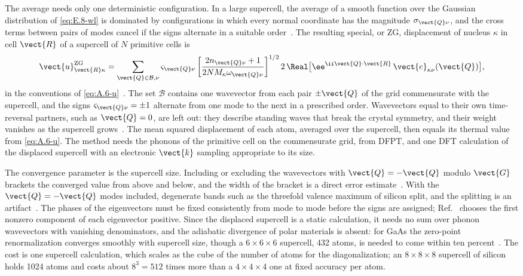 The average needs only one deterministic configuration. In a large supercell, the average of a smooth function over the Gaussian distribution of \cref{eq:E.8-wl} is dominated by configurations in which every normal coordinate has the magnitude $\sigma_{\vect{Q}\nu}$, and the cross terms between pairs of modes cancel if the signs alternate in a suitable order~\cite[Sect.~III]{zacharias2016one}. The resulting special, or ZG, displacement of nucleus $\kappa$ in cell $\vect{R}$ of a supercell of $N$ primitive cells is
\begin{equation}
  \vect{u}^{\mathrm{ZG}}_{\vect{R}\kappa} = \sum_{\vect{Q}\in\mathcal{B},\nu}\varsigma_{\vect{Q}\nu}\left[\frac{2n_{\vect{Q}\nu} + 1}{2NM_\kappa\omega_{\vect{Q}\nu}}\right]^{1/2}2\,\Real\bigl[\ee^{\ii\vect{Q}\cdot\vect{R}}\,\vect{e}_{\kappa\nu}(\vect{Q})\bigr] ,
  \label{eq:E.8-zg}
\end{equation}
in the conventions of \cref{eq:A.6-u}~\cite[Eq.~(2)]{zacharias2020theory}. The set $\mathcal{B}$ contains one wavevector from each pair $\pm\vect{Q}$ of the grid commensurate with the supercell, and the signs $\varsigma_{\vect{Q}\nu} = \pm1$ alternate from one mode to the next in a prescribed order. Wavevectors equal to their own time-reversal partners, such as $\vect{Q} = 0$, are left out: they describe standing waves that break the crystal symmetry, and their weight vanishes as the supercell grows~\cite[Sects.~II and~VII\,B]{zacharias2020theory}. The mean squared displacement of each atom, averaged over the supercell, then equals its thermal value from \cref{eq:A.6-u}. The method needs the phonons of the primitive cell on the commensurate grid, from DFPT, and one DFT calculation of the displaced supercell with an electronic $\vect{k}$ sampling appropriate to its size.

The convergence parameter is the supercell size. Including or excluding the wavevectors with $\vect{Q} = -\vect{Q}$ modulo $\vect{G}$ brackets the converged value from above and below, and the width of the bracket is a direct error estimate~\cite[Sect.~VII\,B]{zacharias2020theory}. With the $\vect{Q} = -\vect{Q}$ modes included, degenerate bands such as the threefold valence maximum of silicon split, and the splitting is an artifact~\cite[Sect.~VII\,B]{zacharias2020theory}. The phases of the eigenvectors must be fixed consistently from mode to mode before the signs are assigned; Ref.~\cite[Sect.~II]{zacharias2016one} chooses the first nonzero component of each eigenvector positive. Since the displaced supercell is a static calculation, it needs no sum over phonon wavevectors with vanishing denominators, and the adiabatic divergence of polar materials is absent: for GaAs the zero-point renormalization converges smoothly with supercell size, though a $6\times6\times6$ supercell, 432 atoms, is needed to come within ten percent~\cite[Sect.~VII]{zacharias2020theory}. The cost is one supercell calculation, which scales as the cube of the number of atoms for the diagonalization; an $8\times8\times8$ supercell of silicon holds 1024 atoms and costs about $8^3 = 512$ times more than a $4\times4\times4$ one at fixed accuracy per atom.

